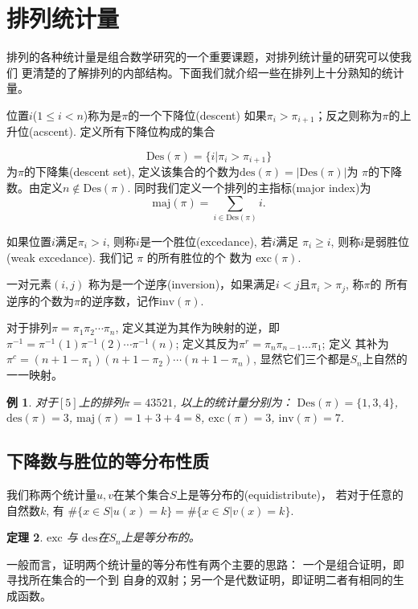\documentclass[a4paper,11pt]{article}
\newtheorem{thm}{定理}[section]
\newtheorem{exa}[thm]{例}
\def \des{\mathrm{des}}
\def \Des{\mathrm{Des}}
\def \maj{\mathrm{maj}}
\def \exc{\mathrm{exc}}
\def \inv{\mathrm{inv}}
\begin{document}
\section{排列统计量}

排列的各种统计量是组合数学研究的一个重要课题，对排列统计量的研究可以使我们
更清楚的了解排列的内部结构。下面我们就介绍一些在排列上十分熟知的统计量。

位置$i$($1\leqslant i<n$)称为是$\pi$的一个{下降位}(descent)
如果$\pi_i>\pi_{i+1}$；反之则称为$\pi$的{上升位}(acscent).
定义所有下降位构成的集合

$$\Des(\pi)=\{i|\pi_i>\pi_{i+1}\}$$
为$\pi$的下降集(descent set),
定义该集合的个数为$\des(\pi)=|\Des(\pi)|$为
$\pi$的下降数。由定义$n\notin \Des(\pi)$.
同时我们定义一个排列的主指标(major index)为
\[\maj(\pi)=\sum \limits_{i \in \Des(\pi)}i.\]

如果位置$i$满足$\pi_i>i$, 则称$i$是一个{胜位}(excedance), 若$i$满足
$\pi_i\geq i$, 则称$i$是{弱胜位}(weak excedance). 我们记 $\pi$
的所有胜位的个 数为 $\exc(\pi)$.

一对元素$(i,j)$
称为是一个{逆序}(inversion)，如果满足$i<j$且$\pi_i>\pi_j$, 称$\pi$的
所有逆序的个数为$\pi$的逆序数，记作$\inv(\pi)$.

对于排列$\pi=\pi_1\pi_2\cdots \pi_n$, 定义其逆为其作为映射的逆，即
$\pi^{-1}=\pi^{-1}(1)\pi^{-1}(2)\cdots \pi^{-1}(n)$;
定义其反为$\pi^r=\pi_n\pi_{n-1}\ldots\pi_1$; 定义
其补为$\pi^c=(n+1-\pi_1)(n+1-\pi_2)\cdots(n+1-\pi_n)$,
显然它们三个都是$S_n$上自然的一一映射。

\begin{exa}
	对于$[5]$上的排列$\pi=43521$, 以上的统计量分别为：
	$\Des(\pi)=\{1,3,4\}$, $\des(\pi)=3$, $\maj(\pi)=1+3+4=8$,
	$\exc(\pi)=3$, $\inv(\pi)=7$.
\end{exa}

\subsection{下降数与胜位的等分布性质}
我们称两个统计量$u,v$在某个集合$S$上是{等分布的}(equidistribute)，
若对于任意的自然数$k$, 有
$\#\{x\in S|u(x)=k\}=\#\{x\in S|v(x)=k\}$.

\begin{thm} \label{exc_des}
	$\exc$ 与 $\des$在$S_n$上是等分布的。
\end{thm}

一般而言，证明两个统计量的等分布性有两个主要的思路：
一个是组合证明，即寻找所在集合的一个到
自身的双射；另一个是代数证明，即证明二者有相同的生成函数。
\end{document}

